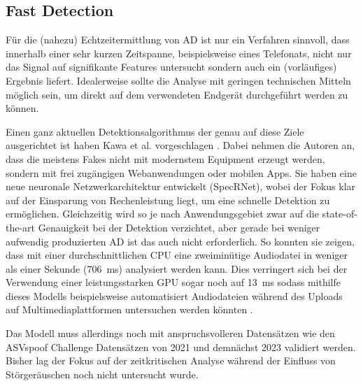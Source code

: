 \subsection{Fast Detection}
Für die (nahezu) Echtzeitermittlung von AD ist nur ein Verfahren sinnvoll, dass innerhalb einer sehr kurzen Zeitspanne, beispielsweise eines Telefonats, nicht nur das Signal auf signifikante Features untersucht sondern auch ein (vorläufiges) Ergebnis liefert.
Idealerweise sollte die Analyse mit geringen technischen Mitteln möglich sein, um direkt auf dem verwendeten Endgerät durchgeführt werden zu können.

Einen ganz aktuellen Detektionsalgorithmus der genau auf diese Ziele ausgerichtet ist haben Kawa et al. vorgeschlagen \citep[][]{Kawa2022}.
Dabei nehmen die Autoren an, dass die meistens Fakes nicht mit modernstem Equipment erzeugt werden, sondern mit frei zugängigen Webanwendungen oder mobilen Apps.
Sie haben eine neue neuronale Netzwerkarchitektur entwickelt (SpecRNet), wobei der Fokus klar auf der Einsparung von Rechenleistung liegt, um eine schnelle Detektion zu ermöglichen.
Gleichzeitig wird so je nach Anwendungsgebiet zwar auf die state-of-the-art Genauigkeit bei der Detektion verzichtet, aber gerade bei weniger aufwendig produzierten AD ist das auch nicht erforderlich.
So konnten sie zeigen, dass mit einer durchschnittlichen CPU eine zweiminütige Audiodatei in weniger als einer Sekunde (\SI{706}{\milli\second}) analysiert werden kann.
Dies verringert sich bei der Verwendung einer leistungsstarken GPU sogar noch auf \SI{13}{\milli\second} sodass mithilfe dieses Modells beispielsweise automatisiert Audiodateien während des Uploads auf Multimediaplattformen untersuchen werden könnten \citep[][]{Kawa2022}.

Das Modell muss allerdings noch mit anspruchsvolleren Datensätzen wie den ASVspoof Challenge Datensätzen von 2021 und demnächst 2023 validiert werden.
Bisher lag der Fokus auf der zeitkritischen Analyse während der Einfluss von Störgeräuschen noch nicht untersucht wurde.
